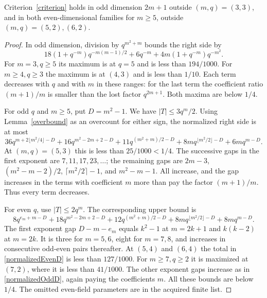 \documentclass[11pt,a4paper]{article}
\begin{document}
\begin{proposition}\label{uniform}
Criterion~\eqref{criterion} holds in odd dimension $2m+1$ outside
$(m,q)=(3,3)$, and in both even-dimensional families for $m\ge5$,
outside $(m,q)=(5,2),(6,2)$.
\end{proposition}
\begin{proof}
In odd dimension, division by $q^{m^2+m}$ bounds the right side by
\begin{equation}\label{normalizedB}
 18(1+q^{-m})q^{-m(m-1)/2}+6q^{-m}
                 +4m(1+q^{-m})q^{-m^2}.
\end{equation}
For $m=3,q\ge5$ its maximum is at $q=5$ and is less than $194/1000$.
For $m\ge4,q\ge3$ the maximum is at $(4,3)$ and is less than $1/10$.
Each term decreases with $q$ and with $m$ in these ranges: for the
last term the coefficient ratio $(m+1)/m$ is smaller than the lost
factor $q^{2m+1}$. Both maxima are below $1/4$.

For odd $q$ and $m\ge5$, put $D=m^2-1$. We have $|T|\le3q^m/2$.
Using Lemma~\ref{overbound} as an overcount for either sign, the normalized
right side is at most
\begin{equation}\label{normalizedOddD}
 36q^{m+2\lfloor m^2/4\rfloor-D}
 +16q^{m^2-2m+2-D}+11q^{(m^2+m)/2-D}
 +8m q^{\lfloor m^2/2\rfloor-D}+6m q^{m-D}.
\end{equation}
At $(m,q)=(5,3)$ this is less than $25/1000<1/4$.
The successive gaps in the first exponent are $7,11,17,23,\ldots$;
the remaining gaps are $2m-3$, $(m^2-m-2)/2$,
$\lceil m^2/2\rceil-1$, and $m^2-m-1$.
All increase, and the gap increases in the terms with coefficient $m$
more than pay the factor $(m+1)/m$. Thus every term decreases.

For even $q$, use $|T|\le2q^m$. The corresponding upper bound is
\begin{equation}\label{normalizedEvenD}
 8q^{e_m+m-D}+18q^{m^2-2m+2-D}+12q^{(m^2+m)/2-D}
 +8m q^{\lfloor m^2/2\rfloor-D}+8m q^{m-D}.
\end{equation}
The first exponent gap $D-m-e_m$ equals $k^2-1$ at $m=2k+1$
and $k(k-2)$ at $m=2k$. It is three for $m=5,6$, eight for
$m=7,8$, and increases in consecutive odd-even pairs thereafter.
At $(5,4)$ and $(6,4)$ the total in \eqref{normalizedEvenD} is less than $127/1000$.
For $m\ge7,q\ge2$ it is maximized at $(7,2)$, where it is less
than $41/1000$. The other exponent gaps increase as in \eqref{normalizedOddD}, again
paying the coefficients $m$. All these bounds are below $1/4$.
The omitted even-field parameters are in the acquired finite list.
\end{proof}
\end{document}
